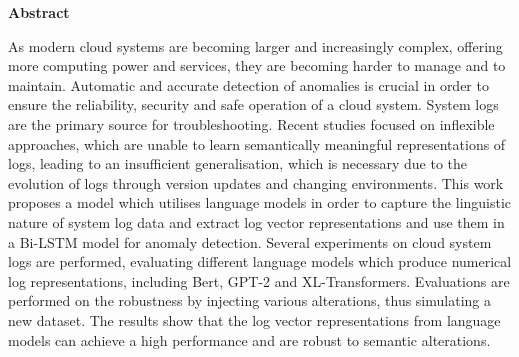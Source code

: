 \thispagestyle{empty}
\vspace*{1.0cm}

\begin{center}
    \textbf{Abstract}
\end{center}

\vspace*{0.5cm}

\noindent
As modern cloud systems are becoming larger and increasingly complex, offering more computing power and services, they are becoming harder to manage and to maintain. Automatic and accurate detection of anomalies is crucial in order to ensure the reliability, security and safe operation of a cloud system. System logs are the primary source for troubleshooting.  Recent studies focused on inflexible approaches, which are unable to learn semantically meaningful representations of logs, leading to an insufficient generalisation, which is necessary due to the evolution of logs through version updates and changing environments. This work proposes a model which utilises language models in order to capture the linguistic nature of system log data and extract log vector representations and use them in a Bi-LSTM model for anomaly detection. Several experiments on cloud system logs are performed, evaluating different language models which produce numerical log representations, including Bert, GPT-2 and XL-Transformers. Evaluations are performed on the robustness by injecting various alterations, thus simulating a new dataset. The results show that the log vector representations from language models can achieve a high performance and are robust to semantic alterations.